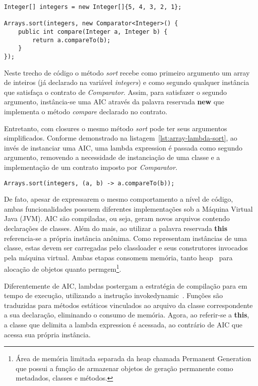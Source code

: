 \documentclass[10pt, conference]{IEEEtran}
\begin{document}
\begin{lstlisting}[caption={Sort - Anonymous Inner Class}, label={lst:array-aic-sort}]
Integer[] integers = new Integer[]{5, 4, 3, 2, 1};

Arrays.sort(integers, new Comparator<Integer>() {
    public int compare(Integer a, Integer b) {
        return a.compareTo(b);
    }
});
\end{lstlisting}

Neste trecho de código o método \textit{sort} recebe como primeiro argumento um array de inteiros (já declarado na variável \textit{integers}) e como segundo qualquer instância que satisfaça o contrato de \textit{Comparator}. Assim, para satisfazer o segundo argumento, instância-se uma AIC através da palavra reservada \textbf{new} que implementa o método \textit{compare} declarado no contrato.

Entretanto, com closures o mesmo método \textit{sort} pode ter seus argumentos simplificados. Conforme demonstrado na listagem~\ref{lst:array-lambda-sort}, ao invés de instanciar uma AIC, uma lambda expression é passada como segundo argumento, removendo a necessidade de instanciação de uma classe e a implementação de um contrato imposto por \textit{Comparator}.

\begin{lstlisting}[caption={Sort - Lambda Expression}, label={lst:array-lambda-sort}]
Arrays.sort(integers, (a, b) -> a.compareTo(b));
\end{lstlisting}

De fato, apesar de expressarem o mesmo comportamento a nível de código, ambas funcionalidades possuem diferentes implementações sob a Máquina Virtual Java (JVM). AIC são compiladas, ou seja, geram novos arquivos contendo declarações de classes. Além do mais, ao utilizar a palavra reservada \textbf{this} referencia-se a própria instância anônima. Como representam instâncias de uma classe, estas devem ser carregadas pelo classloader e seus construtores invocados pela máquina virtual. Ambas etapas consomem memória, tanto heap~\cite{hunt2011java} para alocação de objetos quanto permgem\footnote{Área de memória limitada separada da heap chamada Permanent Generation que possui a função de armazenar objetos de geração permanente como metadados, classes e métodos.}.

Diferentemente de AIC, lambdas postergam a estratégia de compilação para em tempo de execução, utilizando a instrução invokedynamic~\cite{goetz2012translation}. Funções são traduzidas para métodos estáticos vinculados ao arquivo da classe correspondente a sua declaração, eliminando o consumo de memória. Agora, ao referir-se a \textbf{this}, a classe que delimita a lambda expression é acessada, ao contrário de AIC que acessa sua própria instância.
\end{document}
